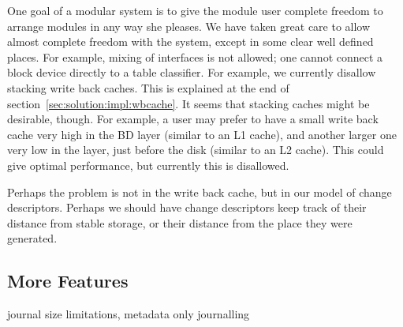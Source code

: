 
One goal of a modular system is to give the module user complete freedom to
arrange modules in any way she pleases. We have taken great care to allow
almost complete freedom with the system, except in some clear well defined
places. For example, mixing of interfaces is not allowed; one cannot
connect a block device directly to a table classifier. For example, we
currently disallow stacking write back caches. This is explained at the end
of section~\ref{sec:solution:impl:wbcache}. It seems that stacking caches
might be desirable, though. For example, a user may prefer to have a small
write back cache very high in the BD layer (similar to an L1 cache), and
another larger one very low in the layer, just before the disk (similar to
an L2 cache). This could give optimal performance, but currently this is
disallowed.

Perhaps the problem is not in the write back cache, but in our model of change
descriptors. Perhaps we should have change descriptors keep track of their
distance from stable storage, or their distance from the place they were
generated.

\subsection{More Features}
journal size limitations, metadata only journalling

